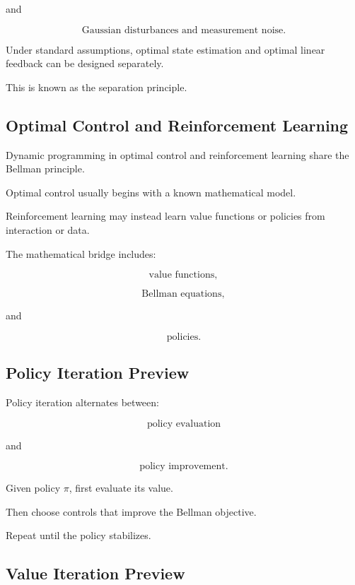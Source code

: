 and

\[
\boxed{
\text{Gaussian disturbances and measurement noise}.
}
\]

Under standard assumptions, optimal state estimation and optimal linear
feedback can be designed separately.

This is known as the separation principle.

\subsection{Optimal Control and Reinforcement Learning}
\label{subsec:optimal-control-reinforcement-learning}

Dynamic programming in optimal control and reinforcement learning share
the Bellman principle.

Optimal control usually begins with a known mathematical model.

Reinforcement learning may instead learn value functions or policies from
interaction or data.

The mathematical bridge includes:

\[
\boxed{
\text{value functions},
}
\]

\[
\boxed{
\text{Bellman equations},
}
\]

and

\[
\boxed{
\text{policies}.
}
\]

\subsection{Policy Iteration Preview}
\label{subsec:policy-iteration-control}

Policy iteration alternates between:

\[
\boxed{
\text{policy evaluation}
}
\]

and

\[
\boxed{
\text{policy improvement}.
}
\]

Given policy \(\pi\), first evaluate its value.

Then choose controls that improve the Bellman objective.

Repeat until the policy stabilizes.

\subsection{Value Iteration Preview}
\label{subsec:value-iteration-control}

